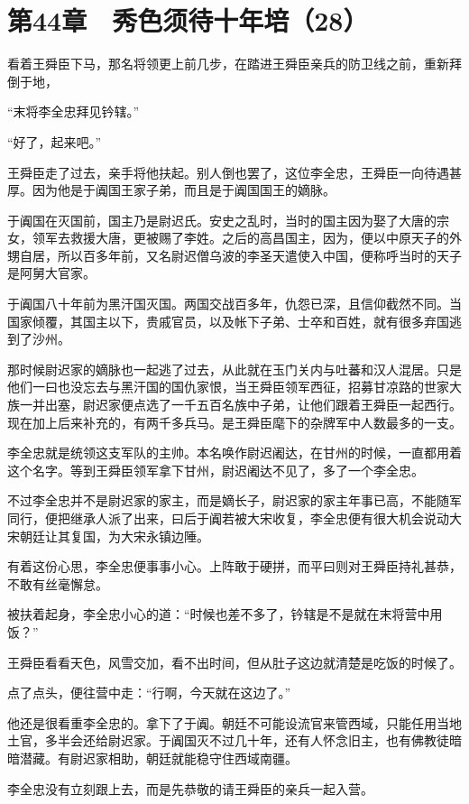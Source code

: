\section{第44章　秀色须待十年培（28）}

看着王舜臣下马，那名将领更上前几步，在踏进王舜臣亲兵的防卫线之前，重新拜倒于地，

“末将李全忠拜见钤辖。”

“好了，起来吧。”

王舜臣走了过去，亲手将他扶起。别人倒也罢了，这位李全忠，王舜臣一向待遇甚厚。因为他是于阗国王家子弟，而且是于阗国国王的嫡脉。

于阗国在灭国前，国主乃是尉迟氏。安史之乱时，当时的国主因为娶了大唐的宗女，领军去救援大唐，更被赐了李姓。之后的高昌国主，因为，便以中原天子的外甥自居，所以百多年前，又名尉迟僧乌波的李圣天遣使入中国，便称呼当时的天子是阿舅大官家。

于阗国八十年前为黑汗国灭国。两国交战百多年，仇怨已深，且信仰截然不同。当国家倾覆，其国主以下，贵戚官员，以及帐下子弟、士卒和百姓，就有很多弃国逃到了沙州。

那时候尉迟家的嫡脉也一起逃了过去，从此就在玉门关内与吐蕃和汉人混居。只是他们一曰也没忘去与黑汗国的国仇家恨，当王舜臣领军西征，招募甘凉路的世家大族一并出塞，尉迟家便点选了一千五百名族中子弟，让他们跟着王舜臣一起西行。现在加上后来补充的，有两千多兵马。是王舜臣麾下的杂牌军中人数最多的一支。

李全忠就是统领这支军队的主帅。本名唤作尉迟阇达，在甘州的时候，一直都用着这个名字。等到王舜臣领军拿下甘州，尉迟阇达不见了，多了一个李全忠。

不过李全忠并不是尉迟家的家主，而是嫡长子，尉迟家的家主年事已高，不能随军同行，便把继承人派了出来，曰后于阗若被大宋收复，李全忠便有很大机会说动大宋朝廷让其复国，为大宋永镇边陲。

有着这份心思，李全忠便事事小心。上阵敢于硬拼，而平曰则对王舜臣持礼甚恭，不敢有丝毫懈怠。

被扶着起身，李全忠小心的道：“时候也差不多了，钤辖是不是就在末将营中用饭？”

王舜臣看看天色，风雪交加，看不出时间，但从肚子这边就清楚是吃饭的时候了。

点了点头，便往营中走：“行啊，今天就在这边了。”

他还是很看重李全忠的。拿下了于阗。朝廷不可能设流官来管西域，只能任用当地土官，多半会还给尉迟家。于阗国灭不过几十年，还有人怀念旧主，也有佛教徒暗暗潜藏。有尉迟家相助，朝廷就能稳守住西域南疆。

李全忠没有立刻跟上去，而是先恭敬的请王舜臣的亲兵一起入营。

